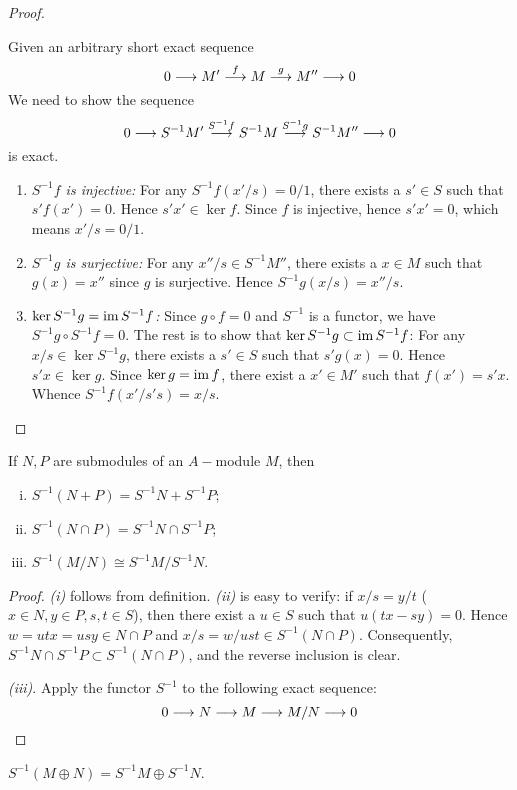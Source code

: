\begin{proof}
\begin{enumerate}[a)]
               Given an arbitrary short exact sequence
               \begin{equation*}
                 0\longrightarrow {M'} \stackrel{{{f}}}{\longrightarrow} {M} \stackrel{{{g}}}{\longrightarrow} {M''} \longrightarrow 0
               \end{equation*}
               We need to show the sequence
               \begin{equation*}
                 0\longrightarrow {S^{-1}M'} \stackrel{{{S^{-1}f}}}{\longrightarrow} {S^{-1}M} \stackrel{{{S^{-1}g}}}{\longrightarrow} {S^{-1}M''} \longrightarrow 0
               \end{equation*}
               is exact.
               \begin{enumerate}[1)]
                 \item \emph{$S^{-1}f$ is injective:}
                          For any $S^{-1}f(x'/s)=0/1$, there exists a $s'\in S$ such that $s'f(x')=0$. Hence $s'x'\in\ker f$. Since $f$ is injective, hence $s'x'=0$, which means $x'/s=0/1$.
                 \item \emph{$S^{-1}g$ is surjective:}
                          For any $x''/s\in S^{-1}M''$, there exists a $x\in M$ such that $g(x)=x''$ since $g$ is surjective. Hence $S^{-1}g(x/s)=x''/s$.
                 \item \emph{$\ker S^{-1}g=\operatorname{im} S^{-1}f$:}
                          Since $g\circ f=0$ and $S^{-1}$ is a functor, we have $S^{-1}g\circ S^{-1}f=0$.
                          The rest is to show that $\ker S^{-1}g\subset\operatorname{im} S^{-1}f$:
                          For any $x/s\in\ker S^{-1}g$, there exists a $s'\in S$ such that $s'g(x)=0$. Hence $s'x\in\ker g$. Since $\ker g=\operatorname{im} f$, there exist a $x'\in M'$ such that $f(x')=s'x$. Whence $S^{-1}f(x'/s's)=x/s$.
               \end{enumerate}
    \end{enumerate}
  \end{proof}

  \begin{prop}
    If $N,P$ are submodules of an $A-$module $M$, then
    \begin{enumerate}[(i)]
      \item $S^{-1}(N+P)=S^{-1}N+S^{-1}P$;
      \item $S^{-1}(N\cap P)=S^{-1}N\cap S^{-1}P$;
      \item $S^{-1}(M/N)\cong S^{-1}M/S^{-1}N$.
    \end{enumerate}
  \end{prop}
  \begin{proof}
    \emph{(i)} follows from definition. \emph{(ii)} is easy to verify: if $x/s=y/t$ ($x\in N,y\in P, s,t\in S$), then there exist a $u\in S$ such that $u(tx-sy)=0$. Hence $w=utx=usy\in N\cap P$ and $x/s=w/ust\in S^{-1}(N\cap P)$. Consequently, $S^{-1}N\cap S^{-1}P\subset S^{-1}(N\cap P)$, and the reverse inclusion is clear.

    \emph{(iii)}. Apply the functor $S^{-1}$ to the following exact sequence:
    \begin{equation*}
      0 \longrightarrow N \longrightarrow M \longrightarrow M/N \longrightarrow 0
    \end{equation*}
  \end{proof}
  \begin{cor}
    $S^{-1}(M\oplus N)=S^{-1}M\oplus S^{-1}N$.
  \end{cor}

